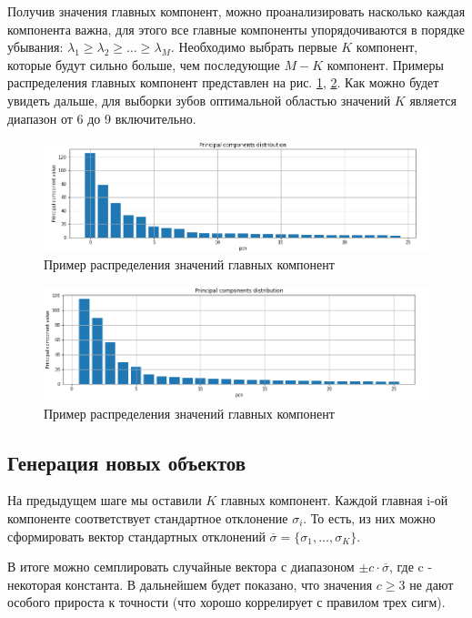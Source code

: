 

Получив значения главных компонент, можно проанализировать насколько каждая компонента важна, для этого все главные компоненты упорядочиваются в порядке убывания: $\lambda_{1} \ge \lambda_{2} \ge \dots \ge \lambda_{M}$.
Необходимо выбрать первые $K$ компонент, которые будут сильно больше, чем последующие $M - K$ компонент. Примеры распределения главных компонент представлен на рис. \ref{fig:pcd-ex-1}, \ref{fig:pcd-ex-2}. Как можно будет увидеть дальше, для выборки зубов 
оптимальной областью значений $K$ является диапазон от 6 до 9 включительно.

\begin{figure}[ht!]
    \includegraphics[width=1\linewidth]{images/pcd-example-1.png}
	\caption{Пример распределения значений главных компонент}
    \label{fig:pcd-ex-1}
\end{figure}

\begin{figure}[ht!]
    \includegraphics[width=1\linewidth]{images/pcd-example-2.png}
	\caption{Пример распределения значений главных компонент}
    \label{fig:pcd-ex-2}
\end{figure}


\subsection{Генерация новых объектов}

На предыдущем шаге мы оставили $K$ главных компонент. Каждой главная i-ой компоненте соответствует стандартное отклонение $\sigma_{i}$. То есть, из них можно сформировать вектор стандартных отклонений $\overline{\sigma} = \{\sigma_{1}, \dots, \sigma_{K}\}$. 


В итоге можно семплировать случайные вектора с диапазоном $\pm c \cdot \overline{\sigma}$, где c - некоторая константа. В дальнейшем будет показано, что значения $c \ge 3$ не дают особого прироста к точности (что хорошо коррелирует с правилом трех сигм).


